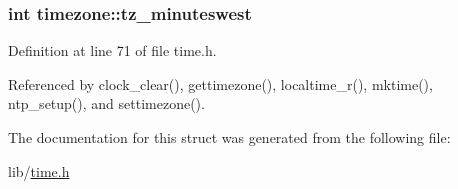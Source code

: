 \subsubsection[{\texorpdfstring{tz\+\_\+minuteswest}{tz_minuteswest}}]{\setlength{\rightskip}{0pt plus 5cm}int timezone\+::tz\+\_\+minuteswest}\hypertarget{structtimezone_a3042f7eff6e1b980728def76b1fa0eb7}{}\label{structtimezone_a3042f7eff6e1b980728def76b1fa0eb7}


Definition at line 71 of file time.\+h.



Referenced by clock\+\_\+clear(), gettimezone(), localtime\+\_\+r(), mktime(), ntp\+\_\+setup(), and settimezone().



The documentation for this struct was generated from the following file\+:\begin{DoxyCompactItemize}
\item 
lib/\hyperlink{time_8h}{time.\+h}\end{DoxyCompactItemize}
